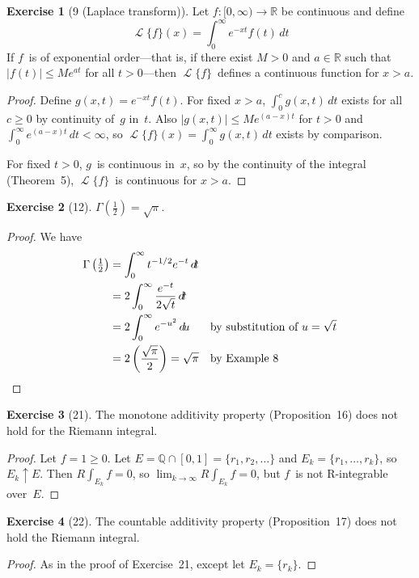 \documentclass[letterpaper,12pt]{article}
\newcommand{\Q}{\mathbb{Q}}
\newcommand{\R}{\mathbb{R}}
\newcommand{\upto}{\uparrow}
\newcommand{\sect}{\cap}
\newcommand{\Rint}{R\!\int}
\renewcommand{\d}[1]{\,d\!{#1}}
\newcommand{\dt}{\d{t}}
\newcommand{\du}{\d{u}}
\DeclareMathOperator{\Lap}{\mathcal{L}}
\newcommand{\abs}[1]{|{#1}|}
\theoremstyle{plain}
\theoremstyle{definition}
\newtheorem*{exer}{Exercise}
\theoremstyle{remark}
\begin{document}
\begin{exer}[9 (Laplace transform)]
Let \(f:[0,\infty)\to\R\) be continuous and define
\[\Lap\{f\}(x)=\int_0^{\infty}e^{-xt}f(t)\dt\]
If \(f\)~is of exponential order---that is, if there exist \(M>0\) and \(a\in\R\) such that \(\abs{f(t)}\le Me^{at}\) for all \(t>0\)---then \(\Lap\{f\}\)~defines a continuous function for \(x>a\).
\end{exer}
\begin{proof}
Define \(g(x,t)=e^{-xt}f(t)\). For fixed \(x>a\), \(\int_0^c g(x,t)\dt\) exists for all \(c\ge 0\) by continuity of~\(g\) in~\(t\). Also \(\abs{g(x,t)}\le Me^{(a-x)t}\) for \(t>0\) and \(\int_0^{\infty}e^{(a-x)t}\dt<\infty\), so \(\Lap\{f\}(x)=\int_0^{\infty}g(x,t)\dt\) exists by comparison.

For fixed \(t>0\), \(g\)~is continuous in~\(x\), so by the continuity of the integral (Theorem~5), \(\Lap\{f\}\)~is continuous for \(x>a\).
\end{proof}

\begin{exer}[12]
\(\Gamma\left(\frac{1}{2}\right)=\sqrt{\pi}\).
\end{exer}
\begin{proof}
We have
\begin{align*}
\Gamma\left(\tfrac{1}{2}\right)&=\int_0^{\infty}t^{-1/2}e^{-t}\dt&&\\
	&=2\int_0^{\infty}\frac{e^{-t}}{2\sqrt{t}}\dt&&\\
	&=2\int_0^{\infty}e^{-u^2}\du&&\text{by substitution of \(u=\sqrt{t}\)}\\
	&=2\left(\frac{\sqrt{\pi}}{2}\right)=\sqrt{\pi}&&\text{by Example~8}\qedhere
\end{align*}
\end{proof}

\begin{exer}[21]
The monotone additivity property (Proposition~16) does not hold for the Riemann integral.
\end{exer}
\begin{proof}
Let \(f=1\ge 0\). Let \(E=\Q\sect[0,1]=\{r_1,r_2,\ldots\}\) and \(E_k=\{r_1,\ldots,r_k\}\), so \(E_k\upto E\). Then \(\Rint_{E_k}f=0\), so \(\lim_{k\to\infty}\Rint_{E_k}f=0\), but \(f\)~is not R-integrable over~\(E\).
\end{proof}

\begin{exer}[22]
The countable additivity property (Proposition~17) does not hold the Riemann integral.
\end{exer}
\begin{proof}
As in the proof of Exercise~21, except let \(E_k=\{r_k\}\).
\end{proof}
\end{document}
